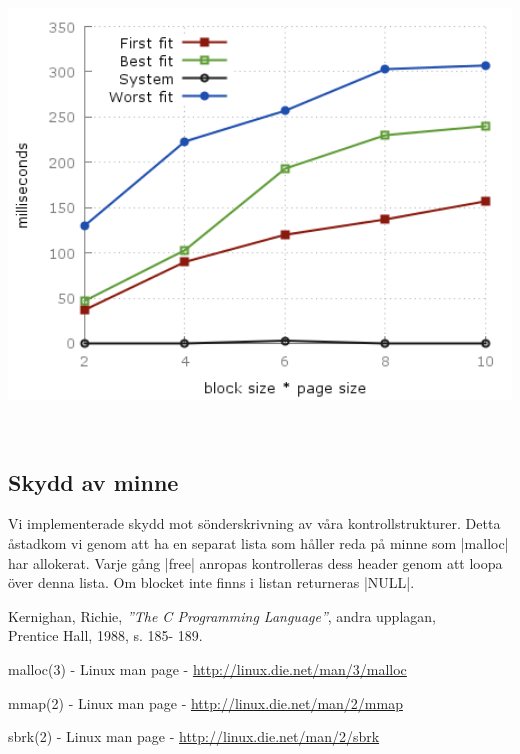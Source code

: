 \documentclass[paper=a4, fontsize=11pt]{scrartcl} %
\numberwithin{equation}{section} %
\numberwithin{figure}{section} %
\numberwithin{table}{section} %
\begin{document}
\begin{minipage}{.5\textwidth}
    \centering
    \includegraphics[width=1\textwidth]{images/time_plot_rand.png}
    \label{fig:p3}
\end{minipage}\\



\subsection{Skydd av minne}

Vi implementerade skydd mot sönderskrivning av våra kontrollstrukturer. 
Detta åstadkom vi genom att ha en separat lista som håller reda på minne som
|malloc| har allokerat.
Varje gång |free| anropas kontrolleras dess header genom att loopa över denna
lista.
Om blocket inte finns i listan returneras |NULL|.


\renewcommand{\refname}{\normalfont\selectfont\normalsize Referenser} 
\newpage
\begin{thebibliography}{9}

Kernighan, Richie, 
\emph{''The C Programming Language''},
 andra upplagan,\\ Prentice Hall, 
 1988,
 s. 185- 189.

malloc(3) - Linux man page -
\url{http://linux.die.net/man/3/malloc}

mmap(2) - Linux man page -
\url{http://linux.die.net/man/2/mmap}

sbrk(2) - Linux man page -
\url{http://linux.die.net/man/2/sbrk}


\end{thebibliography}
\end{document}
